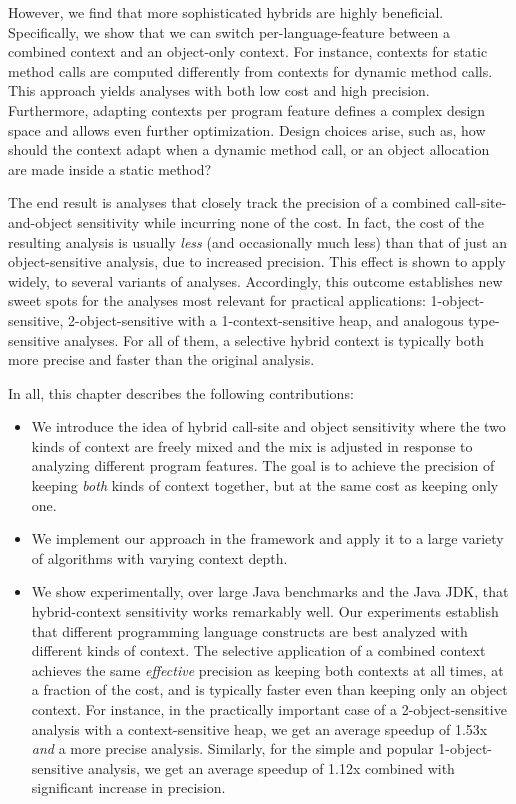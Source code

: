 However, we find that more sophisticated hybrids are highly beneficial. Specifically, we show that we can switch per-language-feature between a combined context and an object-only context. For instance, contexts for static method calls are computed differently from contexts for dynamic method calls. This approach yields analyses with both low cost and high precision. Furthermore, adapting contexts per program feature defines a complex design space and allows even further optimization. Design choices arise, such as, how should the context adapt when a dynamic method call, or an object allocation are made inside a static method?

The end result is analyses that closely track the precision of a combined call-site-and-object sensitivity while incurring none of the cost. In fact, the cost of the resulting analysis is usually \emph{less} (and occasionally much less) than that of just an object-sensitive analysis, due to increased precision. This effect is shown to apply widely, to several variants of analyses. Accordingly, this outcome establishes new sweet spots for the analyses most relevant for practical applications: 1-object-sensitive, 2-object-sensitive with a 1-context-sensitive heap, and analogous type-sensitive \cite{popl:2011:Smaragdakis} analyses. For all of them, a selective hybrid context is typically both more precise and faster than the original analysis.

In all, this chapter describes the following contributions:

\begin{itemize}
\item We introduce the idea of hybrid call-site and object sensitivity where the two kinds of context are freely mixed and the mix is adjusted in response to analyzing different program features. The goal is to achieve the precision of keeping \emph{both} kinds of context together, but at the same cost as keeping only one.

\item We implement our approach in the \doop{} framework and apply it to a large variety of algorithms with varying context depth.

\item We show experimentally, over large Java benchmarks and the Java JDK, that hybrid-context sensitivity works remarkably well. Our experiments establish that different programming language constructs are best analyzed with different kinds of context. The selective application of a combined context achieves the same \emph{effective} precision as keeping both contexts at all times, at a fraction of the cost, and is typically faster even than keeping only an object context. For instance, in the practically important case of a 2-object-sensitive analysis with a context-sensitive heap, we get an average speedup of 1.53x \emph{and} a more precise analysis. Similarly, for the simple and popular 1-object-sensitive analysis, we get an average speedup of 1.12x combined with significant increase in precision.
\end{itemize}


